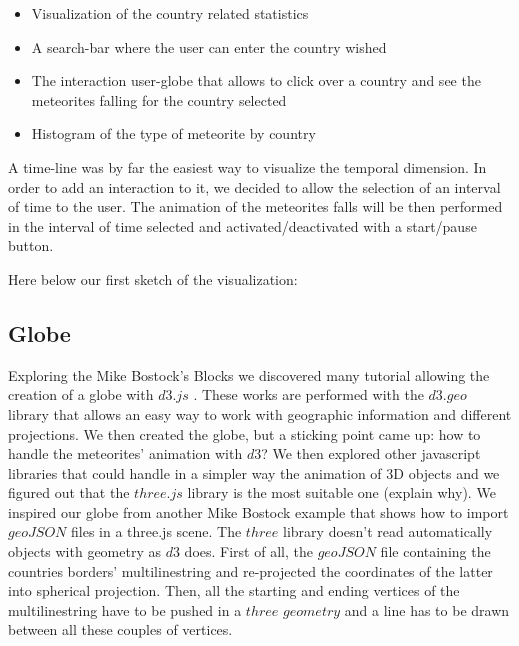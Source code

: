 \documentclass[10pt,conference,compsocconf]{IEEEtran}
\begin{document}
\begin{itemize}
\item Visualization of the country related statistics
\item A search-bar where the user can enter the country wished
\item The interaction user-globe that allows to click over a country and see the meteorites falling for the country selected 
\item Histogram of the type of meteorite by country
\end{itemize}

A time-line was by far the easiest way to visualize the temporal dimension. In order to add an interaction to it, we decided to allow the selection of an interval of time to the user. The animation of the meteorites falls will be then performed in the interval of time selected and activated/deactivated with a start/pause button. 

Here below our first sketch of the visualization:

\subsection{Globe}
Exploring the Mike Bostock's Blocks \cite{bostock_mike_nodate} we discovered many tutorial allowing the creation of a globe with $d3.js$ \cite{bostock_see-through_nodate,bostock_globe_nodate}.  These works are performed with the $d3.geo$ library that allows an easy way to work with geographic information and different projections.
We then created the globe, but a sticking point came up: how to handle the meteorites' animation with $d3$? 
We then explored other javascript libraries that could handle in a simpler way the animation of 3D objects and we figured out that the $three.js$ library \cite{BibEntry2017Nov} is the most suitable one (explain why). 
We inspired our globe from another Mike Bostock example \cite{BibEntry2017Aug} that shows how to import $geoJSON$ files in a three.js scene. The $three$ library doesn't read automatically objects with geometry as $d3$ does. First of all, the $geoJSON$ file containing the countries borders' multilinestring \cite{countryfile} and re-projected the coordinates of the latter into spherical projection. Then, all the starting and ending vertices of the multilinestring have to be pushed in a $three$ $geometry$ and a line has to be drawn between all these couples of vertices. 
\end{document}
